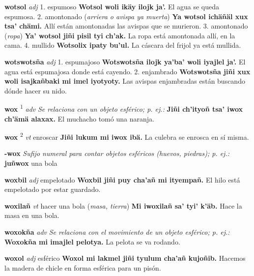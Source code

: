 \documentclass[10pt]{scrbook}
\newcommand{\entry}[1]{\textbf{#1}}
\newcommand{\onedefinition}[1]{#1.}
\newcommand{\defsuperscript}[1]{\textsuperscript{#1}}
\newcommand{\nontranslationdef}[1]{\textit{#1}}
\newcommand{\partofspeech}[1]{\textit{#1}}
\newcommand{\spanishtranslation}[1]{#1}
\newcommand{\clarification}[1]{(\textit{#1})}
\newcommand{\cholexample}[1]{\textbf{#1}}
\newcommand{\exampletranslation}[1]{#1}
\begin{document}
\begin{multicols}{2}
\entry{wotsol}
\partofspeech{adj}
\onedefinition{1}
\spanishtranslation{espumoso}
\cholexample{Wotsol woli ikäy ilojk ja'.}
\exampletranslation{El agua se queda espumosa.}
\onedefinition{2}
\spanishtranslation{amontonado}
\clarification{arriera o avispa ya muerta}
\cholexample{Ya wotsol ichäñäl xux tsa' chämi.}
\exampletranslation{Allí están amontonadas las avispas que se murieron.}
\onedefinition{3}
\spanishtranslation{amontonado}
\clarification{ropa}
\cholexample{Ya' wotsol jiñi pisil tyi ch'ak.}
\exampletranslation{La ropa está amontonada allí, en la cama.}
\onedefinition{4}
\spanishtranslation{mullido}
\cholexample{Wotsolix ipaty bu'ul.}
\exampletranslation{La cáscara del frijol ya está mullida.}

\entry{wotswotsña}
\partofspeech{adj}
\onedefinition{1}
\spanishtranslation{espumajoso}
\cholexample{Wotswotsña ilojk ya'ba' woli iyajlel ja'.}
\exampletranslation{El agua está espumajosa donde está cayendo.}
\onedefinition{2}
\spanishtranslation{enjambrado}
\cholexample{Wotswotsña jiñi xux woli isajkañbaki mi imel iyotyoty.}
\exampletranslation{Las avispas enjambradas están buscando dónde hacer su nido.}

\entry{wox}
\defsuperscript{1}
\partofspeech{adv}
\nontranslationdef{Se relaciona con un objeto esférico; p. ej.:}
\cholexample{Jiñi ch'ityoñ tsa' iwox ch'ämä alaxax.}
\exampletranslation{El muchacho tomó una naranja.}

\entry{wox}
\defsuperscript{2}
\partofspeech{vt}
\spanishtranslation{enroscar}
\cholexample{Jiñi lukum mi iwox ibä.}
\exampletranslation{La culebra se enrosca en sí misma.}

\entry{-wox}
\nontranslationdef{Sufijo numeral para contar objetos esféricos (huevos, piedras); p. ej.:}
\cholexample{juñwox}
\exampletranslation{una bola}

\entry{woxbil}
\partofspeech{adj}
\spanishtranslation{empelotado}
\cholexample{Woxbil jiñi puy cha'añ mi ityempañ.}
\exampletranslation{El hilo está empelotado por estar guardado.}

\entry{woxilañ}
\partofspeech{vt}
\spanishtranslation{hacer una bola}
\clarification{masa, tierra}
\cholexample{Mi iwoxilañ sa' tyi' k'äb.}
\exampletranslation{Hace la masa en una bola.}

\entry{woxokña}
\partofspeech{adv}
\nontranslationdef{Se relaciona con el movimiento de un objeto esférico; p. ej.:}
\cholexample{Woxokña mi imajlel pelotya.}
\exampletranslation{La pelota se va rodando.}

\entry{woxol}
\partofspeech{adj}
\spanishtranslation{esférico}
\cholexample{Woxol mi lakmel jiñi tyulum cha'añ kujoñib.}
\exampletranslation{Hacemos la madera de chicle en forma esférica para un pisón.}


\end{multicols}
\end{document}
